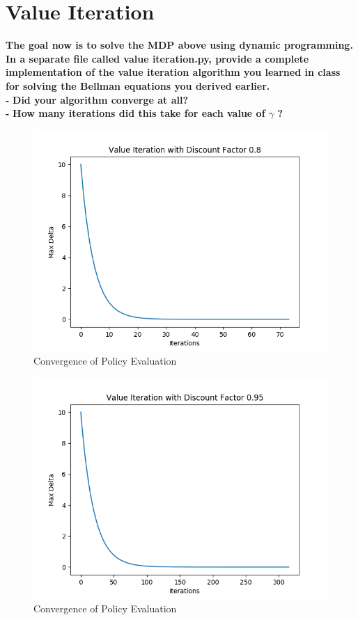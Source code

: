 \documentclass[11pt]{article}
\begin{document}
\newpage
\section{Value Iteration}
\textbf{The goal now is to solve the MDP above using dynamic programming. In a separate
file called value iteration.py, provide a complete implementation of the value
iteration algorithm you learned in class for solving the Bellman equations you
derived earlier.}
\\

\noindent
\textbf{-}
\noindent
\textbf{Did your algorithm converge at all?}
\\

\noindent
\textbf{-}
\noindent
\textbf{How many iterations did this take for each value of $\gamma$ ?}

\begin{figure}[h]
\includegraphics[scale=0.7]{Value_8}
\centering
\caption{Convergence of Policy Evaluation}
\end{figure}

\begin{figure}[h]
\includegraphics[scale=0.7]{Value_95}
\centering
\caption{Convergence of Policy Evaluation}
\end{figure}
\end{document}
